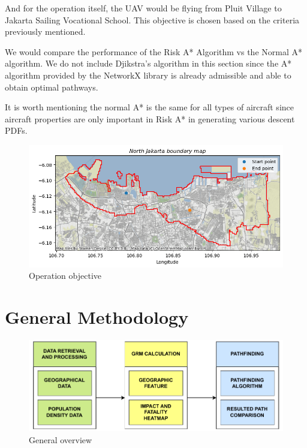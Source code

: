 \documentclass[12pt]{report}
\begin{document}
        And for the operation itself, the UAV would be flying from Pluit Village to Jakarta Sailing Vocational School. This
        objective is chosen based on the criteria previously mentioned.

        We would compare the performance of the Risk A* Algorithm vs the Normal A* algorithm. We do not include Djikstra's
        algorithm in this section since the A* algorithm provided by the NetworkX library is already admissible and able to
        obtain optimal pathways.

        It is worth mentioning the normal A* is the same for all types of aircraft since aircraft properties are only
        important in Risk A* in generating various descent PDFs.

        \begin{figure}[H]
            \centering
            \includegraphics[width=\textwidth]{Plot/route.png}
            \caption{Operation objective}
            \label{fig:map}
        \end{figure}

    \section{General Methodology}
        \begin{figure}[H]
            \centering
            \includegraphics[width=\textwidth]{General Image/OSM Drone-General Overview.pdf}
            \caption{General overview}
        \end{figure}
\end{document}
